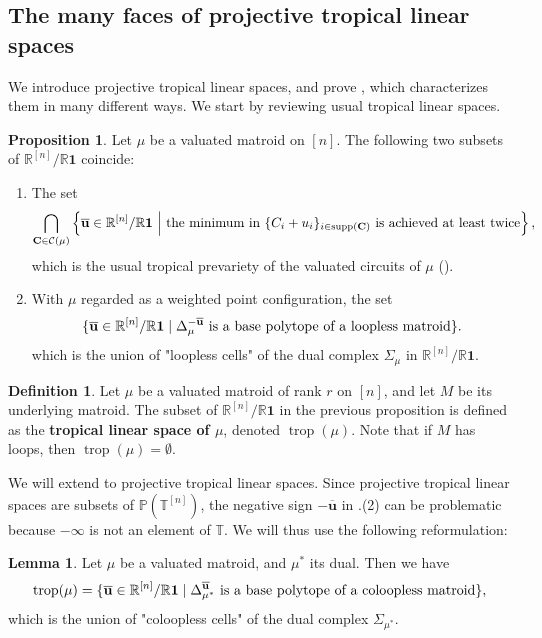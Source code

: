 \documentclass[11pt]{amsart}
\newcommand{\RR}{\mathbb R}
\newcommand{\PP}{\mathbb P}
\newcommand{\TT}{\mathbb T}
\newcommand{\trop}{\operatorname{trop}}
\newcommand{\bu}{{\mathbf u}}
\theoremstyle{definition}
\newtheorem{lem}[thm]{Lemma}
\newtheorem{prop}[thm]{Proposition}
\newtheorem{defn}[thm]{Definition}
\begin{document}
\subsection{The many faces of projective tropical linear spaces}\label{subsection:projtroplin}

We introduce projective tropical linear spaces, and prove , which characterizes them in many different ways.  We start by reviewing usual tropical linear spaces.

\begin{prop}\cite[Lemma 4.4.7]{MS15} \label{prop:troplin}
Let $\mu$ be a valuated matroid on $[n]$.  The following two subsets of $\RR^{[n]}/\RR\mathbf 1$ coincide:
\begin{enumerate}
\item The set
\[
\bigcap_{\mathbf C \in \mathcal C(\mu)} \left\{ \overline\bu \in \RR^{[n]}/\RR\mathbf 1 \ \middle | \ \textnormal{the minimum in } \{C_i + u_i\}_{i\in \operatorname{supp}(\mathbf C)} \textnormal{ is achieved at least twice}\right\},
\]
which is the usual tropical prevariety of the valuated circuits of $\mu$ ().
\item With $\mu$ regarded as a weighted point configuration, the set
\[
\{ \overline\bu \in \RR^{[n]}/\RR\mathbf 1 \mid \Delta_{\mu}^{-\overline\bu} \textnormal{ is a base polytope of a loopless matroid}\}.
\]
which is the union of "loopless cells" of the dual complex $\Sigma_{\mu}$ in $\RR^{[n]}/\RR\mathbf 1$.
\end{enumerate}
\end{prop}

\begin{defn}
Let $\mu$ be a valuated matroid of rank $r$ on $[n]$, and let $M$ be its underlying matroid.  The subset of $\RR^{[n]}/\RR\mathbf 1$ in the previous proposition is defined as the \textbf{tropical linear space of $\mu$}, denoted $\trop(\mu)$.  Note that if $M$ has loops, then $\trop(\mu) = \emptyset$.
\end{defn}

We will extend  to projective tropical linear spaces.  Since projective tropical linear spaces are subsets of $\PP(\TT^{[n]})$, the negative sign $-\overline\bu$ in .(2) can be problematic because $-\infty$ is not an element of $\TT$.  We will thus use the following reformulation:

\begin{samepage}
\begin{lem}\label{lem:coloopless}
Let $\mu$ be a valuated matroid, and $\mu^*$ its dual.  Then we have
\[
\trop(\mu) = \{\overline\bu \in \RR^{[n]}/\RR\mathbf 1 \mid \Delta_{\mu^*}^{\overline\bu} \textnormal{ is a base polytope of a coloopless matroid}\},
\]
which is the union of "coloopless cells" of the dual complex $\Sigma_{\mu^*}$.
\end{lem}
\end{samepage}
\end{document}
